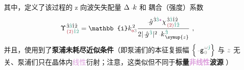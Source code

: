 其中，定义了该过程的 z 向\textcolor{PineGreen}{波矢失配量} $\Delta \xint{\begin{smallmatrix} ~ \\ {}^{}_{\mathcolor{gray}{-}} \\ ~ \end{smallmatrix}}{15}{k}$   和 \textcolor{NavyBlue}{耦合（强度）系数}
\begin{align} \label{eq:coupling-coeff}
	\Upsilon^{\;\! \hat{3} \textcolor{PineGreen}{\hat{3}} \hat{1} \hat{2} }_{\;\! \textcolor{Maroon}{(2)} \textcolor{PineGreen}{\hat{1} \hat{2}}} = \mathbb{i} k_{\textcolor{Maroon}{\mathsf{o}} \mathcolor{gray}{3}}^{\;\! 2} \frac{\xint{{}^{}_{\mathcolor{gray}{-}}}{10}{\hat{g}}^{\;\! \hat{3} \textcolor{PineGreen}{\hat{3}} \textcolor{Plum}{*}}_{\;\! } {\chi}^{\;\! \hat{3} \textcolor{PineGreen}{\hat{3}} \hat{1} \hat{2} }_{\;\! \textcolor{Maroon}{(2)} \textcolor{PineGreen}{\hat{1} \hat{2}}} }{ 2 \lvert \xint{{}^{}_{\mathcolor{gray}{-}}}{10}{\hat{g}}^{\;\! \textcolor{PineGreen}{\hat{3}}} \rvert^2 \xint{\begin{smallmatrix} ~ \\ {}^{}_{\mathcolor{gray}{-}} \\ ~ \end{smallmatrix}}{15}{k}_{\;\! \symup{z}}^{\;\!  \textcolor{PineGreen}{\hat{3}}} } ~,
\end{align}
并且，使用到了\textbf{\textcolor{NavyBlue}{泵浦未耗尽}近似条件}（即\textcolor{NavyBlue}{泵浦们}的\textcolor{PineGreen}{本征复振幅} $\left\{ \xint{\begin{smallmatrix} ~ \\ {}^{}_{\mathcolor{gray}{-}} \\ ~ \end{smallmatrix}}{09}{\mathtt{g}}^{\;\! \mathcolor{gray}{\omega} \textcolor{PineGreen}{\hat{\jmath}}}_{\;\! \mathcolor{gray}{0}} \right\}$ 与 $\mathcolor{gray}{z}$ 无关、\textcolor{NavyBlue}{泵浦们}只在晶体内\textcolor{Plum}{线性}衍射；注意，这类似但不同于\textbf{标量\textcolor{Plum}{非线性}\textcolor{NavyBlue}{波源}} ）
